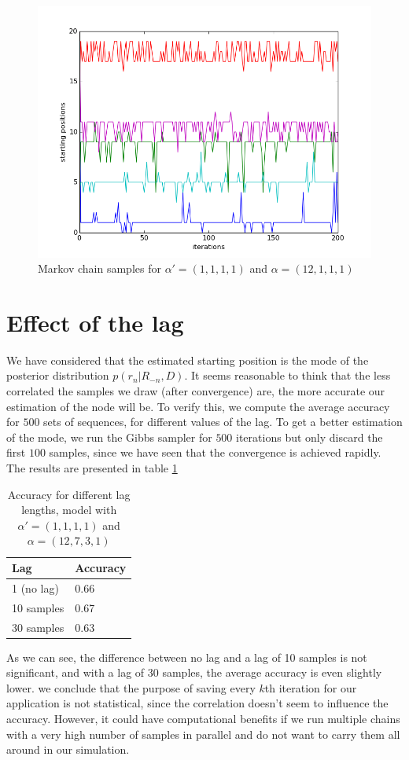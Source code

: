  \begin{figure}[htbp]
  \centering
    \includegraphics[scale = 0.75]{Figures/fig2}
  \caption{Markov chain samples for $\alpha' = (1, 1,1,1)$ and $\alpha = (12, 1, 1, 1)$}
  \label{fig:2}
\end{figure}

\section{Effect of the lag}
We have considered that the estimated starting position is the mode of the posterior distribution $p(r_n | R_{-n}, D)$. It seems reasonable to think that the less correlated the samples we draw (after convergence) are, the more accurate our estimation of the node will be. To verify this, we compute the average accuracy for $500$ sets of sequences, for different values of the lag. To get a better estimation of the mode, we run the Gibbs sampler for $500$ iterations but only discard the first $100$ samples, since we have seen that the convergence is achieved rapidly. The results are presented in table \ref{lag}

\begin{table}[h]
\centering
\caption{Accuracy for different lag lengths, model with $\alpha' = (1, 1,1,1)$ and $\alpha = (12,7,3,1)$}
\label{lag}
\begin{tabular}{|l|l|}
\hline
Lag        & Accuracy \\ \hline
1 (no lag) &     0.66    \\ \hline
10 samples &     0.67    \\ \hline
30 samples &     0.63    \\ \hline
\end{tabular}
\end{table}
 
As we can see, the difference between no lag and a lag of 10 samples is not significant, and with a lag of 30 samples, the average accuracy is even slightly lower. we conclude that the purpose of saving every $k$th iteration for our application is not statistical, since the correlation doesn't seem to influence the accuracy. However, it could have computational benefits if we run multiple chains with a very high number of samples in parallel and do not want to carry them all around in our simulation.
 
